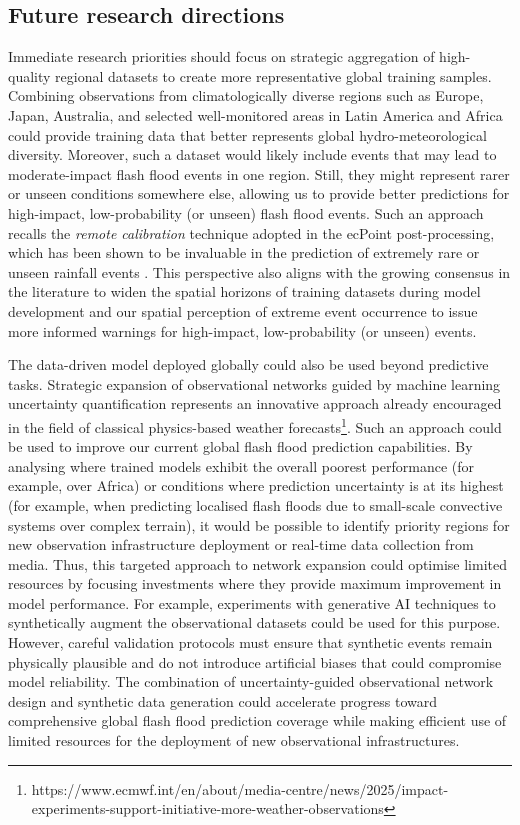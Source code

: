 \subsection{Future research directions}

Immediate research priorities should focus on strategic aggregation of high-quality regional datasets to create more representative global training samples. Combining observations from climatologically diverse regions such as Europe, Japan, Australia, and selected well-monitored areas in Latin America and Africa could provide training data that better represents global hydro-meteorological diversity. Moreover, such a dataset would likely include events that may lead to moderate-impact flash flood events in one region. Still, they might represent rarer or unseen conditions somewhere else, allowing us to provide better predictions for high-impact, low-probability (or unseen) flash flood events. Such an approach recalls the \textit{remote calibration} technique adopted in the ecPoint post-processing, which has been shown to be invaluable in the prediction of extremely rare or unseen rainfall events \citep{Hewson_2021}. This perspective also aligns with the growing consensus in the literature to widen the spatial horizons of training datasets during model development \citep{Kratzert_2024} and our spatial perception of extreme event occurrence \citep{Bertola_2023} to issue more informed warnings for high-impact, low-probability (or unseen) events.

The data-driven model deployed globally could also be used beyond predictive tasks. Strategic expansion of observational networks guided by machine learning uncertainty quantification represents an innovative approach already encouraged in the field of classical physics-based weather forecasts\footnote{https://www.ecmwf.int/en/about/media-centre/news/2025/impact-experiments-support-initiative-more-weather-observations}. Such an approach could be used to improve our current global flash flood prediction capabilities. By analysing where trained models exhibit the overall poorest performance (for example, over Africa) or conditions where prediction uncertainty is at its highest (for example, when predicting localised flash floods due to small-scale convective systems over complex terrain), it would be possible to identify priority regions for new observation infrastructure deployment or real-time data collection from media. Thus, this targeted approach to network expansion could optimise limited resources by focusing investments where they provide maximum improvement in model performance. For example, experiments with generative AI techniques to synthetically augment the observational datasets could be used for this purpose. However, careful validation protocols must ensure that synthetic events remain physically plausible and do not introduce artificial biases that could compromise model reliability. The combination of uncertainty-guided observational network design and synthetic data generation could accelerate progress toward comprehensive global flash flood prediction coverage while making efficient use of limited resources for the deployment of new observational infrastructures.